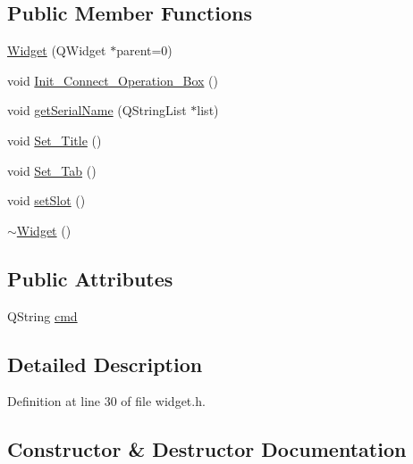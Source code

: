 \subsection*{Public Member Functions}
\begin{DoxyCompactItemize}
\item 
\mbox{\hyperlink{class_widget_a29531c7f141e461322981b3b579d4590}{Widget}} (Q\+Widget $\ast$parent=0)
\item 
void \mbox{\hyperlink{class_widget_a73ede9961382ea942361e9845fa11aa0}{Init\+\_\+\+Connect\+\_\+\+Operation\+\_\+\+Box}} ()
\item 
void \mbox{\hyperlink{class_widget_afb97de9294ffdbb2c64ed1f96aea9261}{get\+Serial\+Name}} (Q\+String\+List $\ast$list)
\item 
void \mbox{\hyperlink{class_widget_a5323ca5c4124c0d187a2f1398ef48844}{Set\+\_\+\+Title}} ()
\item 
void \mbox{\hyperlink{class_widget_ac611086a6f74fe7bab712f23ab7126d8}{Set\+\_\+\+Tab}} ()
\item 
void \mbox{\hyperlink{class_widget_ac60c5a62bc3197fbc7ade8f40df70c70}{set\+Slot}} ()
\item 
\mbox{\hyperlink{class_widget_aa24f66bcbaaec6d458b0980e8c8eae65}{$\sim$\+Widget}} ()
\end{DoxyCompactItemize}
\subsection*{Public Attributes}
\begin{DoxyCompactItemize}
\item 
Q\+String \mbox{\hyperlink{class_widget_a08095644a5511e36fc9e52228e79dc81}{cmd}}
\end{DoxyCompactItemize}


\subsection{Detailed Description}


Definition at line 30 of file widget.\+h.



\subsection{Constructor \& Destructor Documentation}
\mbox{\label{class_widget_a29531c7f141e461322981b3b579d4590}} 
